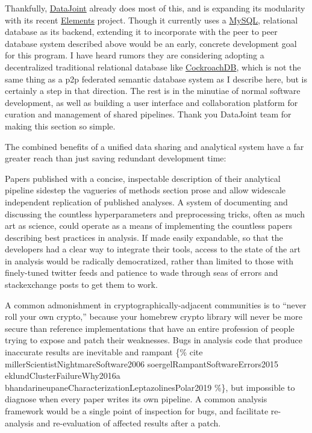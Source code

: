 \documentclass{article}
\begin{document}
Thankfully, \href{https://datajoint.io/}{DataJoint} already does most of
this, and is expanding its modularity with its recent
\href{https://github.com/datajoint/datajoint-elements}{Elements}
project. Though it currently uses a
\href{https://docs.datajoint.io/python/admin/1-hosting.html}{MySQL},
relational database as its backend, extending it to incorporate with the
peer to peer database system described above would be an early, concrete
development goal for this program. I have heard rumors they are
considering adopting a decentralized traditional relational database
like \href{https://www.cockroachlabs.com/product/}{CockroachDB}, which
is not the same thing as a p2p federated semantic database system as I
describe here, but is certainly a step in that direction. The rest is in
the minutiae of normal software development, as well as building a user
interface and collaboration platform for curation and management of
shared pipelines. Thank you DataJoint team for making this section so
simple.

The combined benefits of a unified data sharing and analytical system
have a far greater reach than just saving redundant development time:

Papers published with a concise, inspectable description of their
analytical pipeline sidestep the vagueries of methods section prose and
allow widescale independent replication of published analyses. A system
of documenting and discussing the countless hyperparameters and
preprocessing tricks, often as much art as science, could operate as a
means of implementing the countless papers describing best practices in
analysis. If made easily expandable, so that the developers had a clear
way to integrate their tools, access to the state of the art in analysis
would be radically democratized, rather than limited to those with
finely-tuned twitter feeds and patience to wade through seas of errors
and stackexchange posts to get them to work.

A common admonishment in cryptographically-adjacent communities is to
``never roll your own crypto,'' because your homebrew crypto library
will never be more secure than reference implementations that have an
entire profession of people trying to expose and patch their weaknesses.
Bugs in analysis code that produce inaccurate results are inevitable and
rampant \{\% cite millerScientistNightmareSoftware2006
soergelRampantSoftwareErrors2015 eklundClusterFailureWhy2016a
bhandarineupaneCharacterizationLeptazolinesPolar2019 \%\}, but
impossible to diagnose when every paper writes its own pipeline. A
common analysis framework would be a single point of inspection for
bugs, and facilitate re-analysis and re-evaluation of affected results
after a patch.
\end{document}
